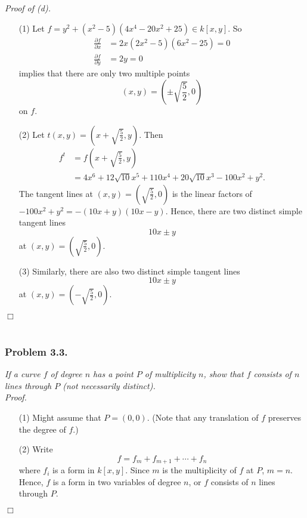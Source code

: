 \documentclass{article}
\begin{document}
\emph{Proof of (d).}
\begin{enumerate}
\item[(1)]
  Let $f = y^2 + (x^2 - 5)(4x^4 - 20x^2 + 25) \in k[x,y]$.
  So
  \begin{align*}
    \frac{\partial f}{\partial x} &= 2x(2x^2-5)(6x^2-25) = 0 \\
    \frac{\partial f}{\partial y} &= 2y = 0
  \end{align*}
  implies that there are only two multiple points
  \[
    (x,y) = \left( \pm\sqrt{\frac{5}{2}}, 0 \right)
  \]
  on $f$.

\item[(2)]
  Let $t(x,y) = \left( x + \sqrt{\frac{5}{2}}, y \right)$.
  Then
  \begin{align*}
    f^{t}
    &= f\left( x + \sqrt{\frac{5}{2}}, y \right) \\
    &= 4 x^6 + 12\sqrt{10} x^5 + 110 x^4 + 20\sqrt{10} x^3 - 100 x^2 + y^2.
  \end{align*}
  The tangent lines at $(x,y) = \left( \sqrt{\frac{5}{2}}, 0 \right)$ is the linear factors of
  $-100 x^2 + y^2 = -(10x+y)(10x-y)$.
  Hence, there are two distinct simple tangent lines
  \[
    10x \pm y
  \]
  at $(x,y) = \left( \sqrt{\frac{5}{2}}, 0 \right)$.

\item[(3)]
  Similarly, there are also two distinct simple tangent lines
  \[
    10x \pm y
  \]
  at $(x,y) = \left( -\sqrt{\frac{5}{2}}, 0 \right)$.
  \end{enumerate}
$\Box$ \\\\






\subsubsection*{Problem 3.3.}
\emph{If a curve $f$ of degree $n$ has a point $P$ of multiplicity $n$,
show that $f$ consists of $n$ lines through $P$ (not necessarily distinct).} \\



\emph{Proof.}
\begin{enumerate}
\item[(1)]
  Might assume that $P = (0,0)$.
  (Note that any translation of $f$ preserves the degree of $f$.)

\item[(2)]
  Write
  \[
    f = f_m + f_{m+1} + \cdots + f_n
  \]
  where $f_i$ is a form in $k[x,y]$.
  Since $m$ is the multiplicity of $f$ at $P$, $m = n$.
  Hence, $f$ is a form in two variables of degree $n$,
  or $f$ consists of $n$ lines through $P$.
\end{enumerate}
$\Box$ \\\\
\end{document}
